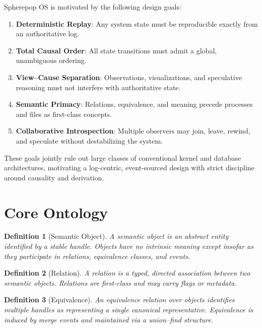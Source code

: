 \documentclass[11pt]{article}
\newtheorem{definition}{Definition}[section]
\begin{document}
Spherepop OS is motivated by the following design goals:

\begin{enumerate}[label=G\arabic*.]
\item \textbf{Deterministic Replay}: Any system state must be reproducible exactly from an authoritative log.
\item \textbf{Total Causal Order}: All state transitions must admit a global, unambiguous ordering.
\item \textbf{View--Cause Separation}: Observations, visualizations, and speculative reasoning must not interfere with authoritative state.
\item \textbf{Semantic Primacy}: Relations, equivalence, and meaning precede processes and files as first-class concepts.
\item \textbf{Collaborative Introspection}: Multiple observers may join, leave, rewind, and speculate without destabilizing the system.
\end{enumerate}

These goals jointly rule out large classes of conventional kernel and database architectures, motivating a log-centric, event-sourced design with strict discipline around causality and derivation.

\section{Core Ontology}

\begin{definition}[Semantic Object]
A semantic object is an abstract entity identified by a stable handle. Objects have no intrinsic meaning except insofar as they participate in relations, equivalence classes, and events.
\end{definition}

\begin{definition}[Relation]
A relation is a typed, directed association between two semantic objects. Relations are first-class and may carry flags or metadata.
\end{definition}

\begin{definition}[Equivalence]
An equivalence relation over objects identifies multiple handles as representing a single canonical representative. Equivalence is induced by merge events and maintained via a union--find structure.
\end{definition}
\end{document}
